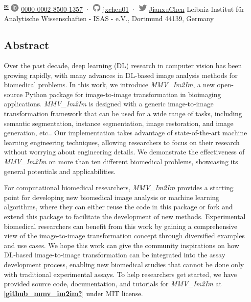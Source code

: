 \begin{itemize}
  \textsuperscript{\protect\hyperlink{correspondence}{✉}}
  \includegraphics[width=0.16667in,height=0.16667in]{images/orcid.svg}
  \href{https://orcid.org/0000-0002-8500-1357}{0000-0002-8500-1357}
  · \includegraphics[width=0.16667in,height=0.16667in]{images/github.svg}
  \href{https://github.com/jxchen01}{jxchen01}
  · \includegraphics[width=0.16667in,height=0.16667in]{images/twitter.svg}
  \href{https://twitter.com/JianxuChen}{JianxuChen}
  Leibniz-Institut für Analytische Wissenschaften - ISAS - e.V., Dortmund 44139, Germany
\end{itemize}

\hypertarget{abstract}{%
\subsection{Abstract}\label{abstract}}

Over the past decade, deep learning (DL) research in computer vision has been growing rapidly, with many advances in DL-based image analysis methods for biomedical problems. In this work, we introduce \emph{MMV\_Im2Im}, a new open-source Python package for image-to-image transformation in bioimaging applications. \emph{MMV\_Im2Im} is designed with a generic image-to-image transformation framework that can be used for a wide range of tasks, including semantic segmentation, instance segmentation, image restoration, and image generation, etc.. Our implementation takes advantage of state-of-the-art machine learning engineering techniques, allowing researchers to focus on their research without worrying about engineering details. We demonstrate the effectiveness of \emph{MMV\_Im2Im} on more than ten different biomedical problems, showcasing its general potentials and applicabilities.

For computational biomedical researchers, \emph{MMV\_Im2Im} provides a starting point for developing new biomedical image analysis or machine learning algorithms, where they can either reuse the code in this package or fork and extend this package to facilitate the development of new methods. Experimental biomedical researchers can benefit from this work by gaining a comprehensive view of the image-to-image transformation concept through diversified examples and use cases. We hope this work can give the community inspirations on how DL-based image-to-image transformation can be integrated into the assay development process, enabling new biomedical studies that cannot be done only with traditional experimental assays. To help researchers get started, we have provided source code, documentation, and tutorials for \emph{MMV\_Im2Im} at {[}\protect\hyperlink{ref-github_mmv_im2im}{\textbf{github\_mmv\_im2im?}}{]} under MIT license.

